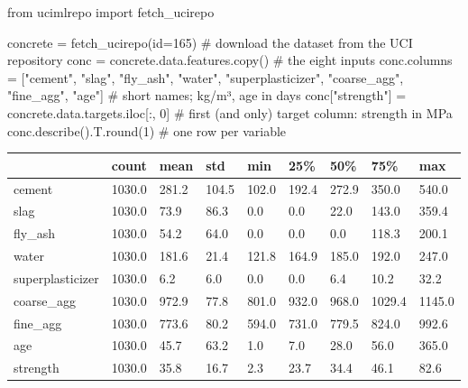 \documentclass[
  letterpaper,
  DIV=11,
  numbers=noendperiod]{scrreprt}
\newenvironment{Shaded}{\begin{snugshade}}{\end{snugshade}}
\newcommand{\BuiltInTok}[1]{\textcolor[rgb]{0.00,0.23,0.31}{#1}}
\newcommand{\CommentTok}[1]{\textcolor[rgb]{0.37,0.37,0.37}{#1}}
\newcommand{\DecValTok}[1]{\textcolor[rgb]{0.68,0.00,0.00}{#1}}
\newcommand{\ImportTok}[1]{\textcolor[rgb]{0.00,0.46,0.62}{#1}}
\newcommand{\NormalTok}[1]{\textcolor[rgb]{0.00,0.23,0.31}{#1}}
\newcommand{\OperatorTok}[1]{\textcolor[rgb]{0.37,0.37,0.37}{#1}}
\newcommand{\StringTok}[1]{\textcolor[rgb]{0.13,0.47,0.30}{#1}}
\begin{document}
\begin{Shaded}
\begin{Highlighting}[]
\ImportTok{from}\NormalTok{ ucimlrepo }\ImportTok{import}\NormalTok{ fetch\_ucirepo}

\NormalTok{concrete }\OperatorTok{=}\NormalTok{ fetch\_ucirepo(}\BuiltInTok{id}\OperatorTok{=}\DecValTok{165}\NormalTok{)                            }\CommentTok{\# download the dataset from the UCI repository}
\NormalTok{conc }\OperatorTok{=}\NormalTok{ concrete.data.features.copy()                        }\CommentTok{\# the eight inputs}
\NormalTok{conc.columns }\OperatorTok{=}\NormalTok{ [}\StringTok{"cement"}\NormalTok{, }\StringTok{"slag"}\NormalTok{, }\StringTok{"fly\_ash"}\NormalTok{, }\StringTok{"water"}\NormalTok{, }\StringTok{"superplasticizer"}\NormalTok{,}
                \StringTok{"coarse\_agg"}\NormalTok{, }\StringTok{"fine\_agg"}\NormalTok{, }\StringTok{"age"}\NormalTok{]            }\CommentTok{\# short names; kg/m³, age in days}
\NormalTok{conc[}\StringTok{"strength"}\NormalTok{] }\OperatorTok{=}\NormalTok{ concrete.data.targets.iloc[:, }\DecValTok{0}\NormalTok{]         }\CommentTok{\# first (and only) target column: strength in MPa}
\NormalTok{conc.describe().T.}\BuiltInTok{round}\NormalTok{(}\DecValTok{1}\NormalTok{)                                  }\CommentTok{\# one row per variable}
\end{Highlighting}
\end{Shaded}

\begin{longtable}[]{@{}lllllllll@{}}
\toprule\noalign{}
& count & mean & std & min & 25\% & 50\% & 75\% & max \\
\midrule\noalign{}
\endhead
\bottomrule\noalign{}
\endlastfoot
cement & 1030.0 & 281.2 & 104.5 & 102.0 & 192.4 & 272.9 & 350.0 &
540.0 \\
slag & 1030.0 & 73.9 & 86.3 & 0.0 & 0.0 & 22.0 & 143.0 & 359.4 \\
fly\_ash & 1030.0 & 54.2 & 64.0 & 0.0 & 0.0 & 0.0 & 118.3 & 200.1 \\
water & 1030.0 & 181.6 & 21.4 & 121.8 & 164.9 & 185.0 & 192.0 & 247.0 \\
superplasticizer & 1030.0 & 6.2 & 6.0 & 0.0 & 0.0 & 6.4 & 10.2 & 32.2 \\
coarse\_agg & 1030.0 & 972.9 & 77.8 & 801.0 & 932.0 & 968.0 & 1029.4 &
1145.0 \\
fine\_agg & 1030.0 & 773.6 & 80.2 & 594.0 & 731.0 & 779.5 & 824.0 &
992.6 \\
age & 1030.0 & 45.7 & 63.2 & 1.0 & 7.0 & 28.0 & 56.0 & 365.0 \\
strength & 1030.0 & 35.8 & 16.7 & 2.3 & 23.7 & 34.4 & 46.1 & 82.6 \\
\end{longtable}
\end{document}
